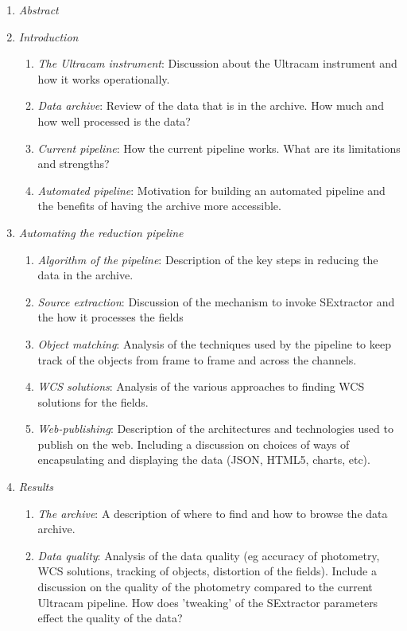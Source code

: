 \documentclass[a4paper,10pt]{article}
\begin{document}
\begin{enumerate}
	\item \emph{Abstract}
	\item \emph{Introduction} 
	\begin{enumerate}
	      \item \emph{The Ultracam instrument}: Discussion about the Ultracam instrument and how it works operationally. 
	      \item \emph{Data archive}: Review of the data that is in the archive. How much and how well processed is the data? 
	      \item \emph{Current pipeline}: How the current pipeline works. What are its limitations and strengths?
	      \item \emph{Automated pipeline}: Motivation for building an automated pipeline and the benefits of having the archive more accessible. 
	\end{enumerate}
	\item \emph{Automating the reduction pipeline} 
	\begin{enumerate}
	      \item \emph{Algorithm of the pipeline}: Description of the key steps in reducing the data in the archive. 
	      \item \emph{Source extraction}: Discussion of the mechanism to invoke SExtractor and the how it processes the fields 
	      \item \emph{Object matching}: Analysis of the techniques used by the pipeline to keep track of the objects from frame to frame and across the channels. 
	      \item \emph{WCS solutions}: Analysis of the various approaches to finding WCS solutions for the fields. 
	      \item \emph{Web-publishing}: Description of the architectures and technologies used to publish on the web. Including a discussion on choices of ways of encapsulating and displaying the data (JSON, HTML5, charts, etc).
	\end{enumerate}
	\item \emph{Results}
	\begin{enumerate}
	      \item \emph{The archive}: A description of where to find and how to browse the data archive. 
	      \item \emph{Data quality}: Analysis of the data quality (eg accuracy of photometry, WCS solutions, tracking of objects, distortion of the fields). Include a discussion on the quality of the photometry compared to the current Ultracam pipeline. How does 'tweaking' of the SExtractor parameters effect the quality of the data? 

\end{enumerate}
\end{enumerate}
\end{document}
